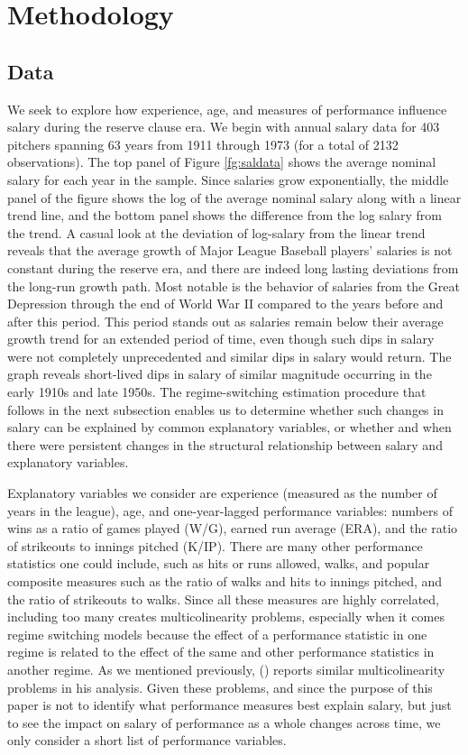 \documentclass[12pt]{article}
\newcommand{\citee}[1]{\citename{#1} (\citeyear{#1})}
\begin{document}
\section{Methodology}\label{s:method}
\subsection{Data}

We seek to explore how experience, age, and measures of performance influence salary during the reserve clause era.  We begin with annual salary data for 403 pitchers spanning 63 years from 1911 through 1973 (for a total of 2132 observations).  The top panel of Figure \ref{fg:saldata} shows the average nominal salary for each year in the sample.  Since salaries grow exponentially, the middle panel of the figure shows the log of the average nominal salary along with a linear trend line, and the bottom panel shows the difference from the log salary from the trend.  A casual look at the deviation of log-salary from the linear trend reveals that the average growth of Major League Baseball players' salaries is not constant during the reserve era, and there are indeed long lasting deviations from the long-run growth path.  Most notable is the behavior of salaries from the Great Depression through the end of World War II compared to the years before and after this period.  This period stands out as salaries remain below their average growth trend for an extended period of time, even though such dips in salary were not completely unprecedented and similar dips in salary would return.  The graph reveals short-lived dips in salary of similar magnitude occurring in the early 1910s and late 1950s.  The regime-switching estimation procedure that follows in the next subsection enables us to determine whether such changes in salary can be explained by common explanatory variables, or whether and when there were persistent changes in the structural relationship between salary and explanatory variables.

Explanatory variables we consider are experience (measured as the number of years in the league), age, and one-year-lagged performance variables: numbers of wins as a ratio of games played (W/G), earned run average (ERA), and the ratio of strikeouts to innings pitched (K/IP).  There are many other performance statistics one could include, such as hits or runs allowed, walks, and popular composite measures such as the ratio of walks and hits to innings pitched, and the ratio of strikeouts to walks.  Since all these measures are highly correlated, including too many creates multicolinearity problems, especially when it comes regime switching models because the effect of a performance statistic in one regime is related to the effect of the same and other performance statistics in another regime.  As we mentioned previously, \citee{scully1974} reports similar multicolinearity problems in his analysis.  Given these problems, and since the purpose of this paper is not to identify what performance measures best explain salary, but just to see the impact on salary of performance as a whole changes across time, we only consider a short list of performance variables.
\end{document}
